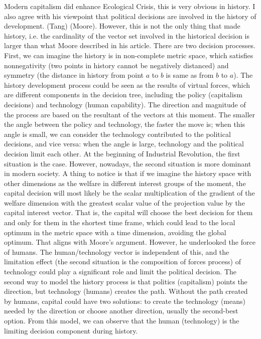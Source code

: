\documentclass[12pt]{article}
\newcommand{\IR}{Industrial Revolution}
\newcommand{\EC}{Ecological Crisis}
\begin{document}
\begin{flushleft}
Modern capitalism did enhance \EC, this is very obvious in history. I also agree with his viewpoint that political decisions are involved in the history of development. (Tang) (Moore). However, this is not the only thing that made history, i.e. the cardinality of the vector set involved in the historical decision is larger than what Moore described in his article. There are two decision processes. First, we can imagine the history is in non-complete metric space, which satisfies nonnegativity (two points in history cannot be negatively distanced) and symmetry (the distance in history from point $a$ to $b$ is same as from $b$ to $a$).
The history development process could be seen as the results of virtual forces, which are different components in the decision tree, including the policy (capitalism decisions) and technology (human capability). The direction and magnitude of the process are based on the resultant of the vectors at this moment. The smaller the angle between the policy and technology, the faster the move is; when this angle is small, we can consider the technology contributed to the political decisions, and vice versa: when the angle is large, technology and the political decision limit each other.  At the beginning of \IR, the first situation is the case. However, nowadays, the second situation is more dominant in modern society. A thing to notice is that if we imagine the history space with other dimensions as the welfare in different interest groups of the moment, the capital decision will most likely be the scalar multiplication of the gradient of the welfare dimension with the greatest scalar value of the projection value by the capital interest vector. That is, the capital will choose the best decision for them and only for them in the shortest time frame, which could lead to the local optimum in the metric space with a time dimension, avoiding the global optimum.  
That aligns with Moore's argument. However, he underlooked the force of humans.
The human/technology vector is independent of this, and the limitation effect (the second situation is the composition of forces process) of technology could play a significant role and limit the political decision. 
The second way to model the history process is that politics (capitalism) points the direction, but technology (humans) creates the path. Without the path created by humans, capital could have two solutions: to create the technology (means) needed by the direction or choose another direction, usually the second-best option. From this model, we can observe that the human (technology) is the limiting decision component during history.


\end{flushleft}
\end{document}
